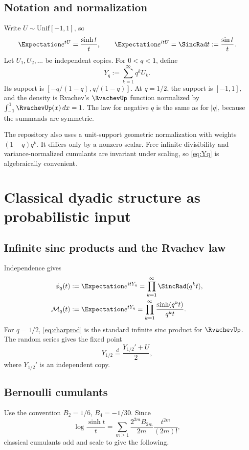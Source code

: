 \documentclass[11pt,oneside]{article}
\theoremstyle{definition}
\theoremstyle{remark}
\begin{document}
\subsection{Notation and normalization}
Write \(U\sim\mathrm{Unif}[-1,1]\), so
\[
\Expectation e^{tU}=\frac{\sinh t}{t},\qquad \Expectation e^{itU}=\SincRad t:=\frac{\sin t}{t}.
\]
Let \(U_1,U_2,\ldots\) be independent copies. For \(0<q<1\), define
\begin{equation}\label{eq:Yq}
Y_q:=\sum_{k=1}^{\infty}q^kU_k.
\end{equation}
Its support is \([-q/(1-q),q/(1-q)]\). At \(q=1/2\), the support is \([-1,1]\), and the density is Rvachev's \(\RvachevUp\) function normalized by \(\int_{-1}^1\RvachevUp(x)\,dx=1\). The law for negative \(q\) is the same as for \(|q|\), because the summands are symmetric.

The repository also uses a unit-support geometric normalization with weights \((1-q)q^k\). It differs only by a nonzero scalar. Free infinite divisibility and variance-normalized cumulants are invariant under scaling, so \eqref{eq:Yq} is algebraically convenient.

\section{Classical dyadic structure as probabilistic input}
\subsection{Infinite sinc products and the Rvachev law}
Independence gives
\begin{align}
\phi_q(t)&:=\Expectation e^{itY_q}=\prod_{k=1}^{\infty}\SincRad(q^kt),\label{eq:charprod}\\
\mathcal M_q(t)&:=\Expectation e^{tY_q}=\prod_{k=1}^{\infty}\frac{\sinh(q^kt)}{q^kt}.\label{eq:mgfprod}
\end{align}
For \(q=1/2\), \eqref{eq:charprod} is the standard infinite sinc product for \(\RvachevUp\). The random series gives the fixed point
\begin{equation}\label{eq:fixedY}
Y_{1/2}\stackrel{d}{=}\frac{Y_{1/2}'+U}{2},
\end{equation}
where \(Y_{1/2}'\) is an independent copy.

\subsection{Bernoulli cumulants}
Use the convention \(B_2=1/6\), \(B_4=-1/30\). Since
\[
\log\frac{\sinh t}{t}=\sum_{m\ge1}\frac{2^{2m}B_{2m}}{2m}\frac{t^{2m}}{(2m)!},
\]
classical cumulants add and scale to give the following.
\end{document}
